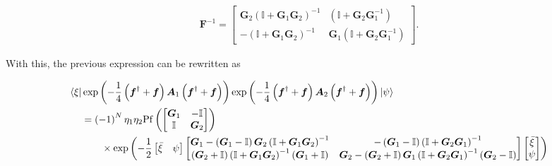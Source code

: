 \documentclass{article}
\begin{document}
	\begin{align}
		\boldsymbol{F}^{-1} =
		\begin{bmatrix}
			\boldsymbol{G}_{2}\left(\mathbb{I} + \boldsymbol{G}_{1}\boldsymbol{G}_{2} \right)^{-1} & \left(\mathbb{I} + \boldsymbol{G}_{2}\boldsymbol{G}_{1}^{-1} \right)\\
			-\left(\mathbb{I} + \boldsymbol{G}_{1}\boldsymbol{G}_{2} \right)^{-1} & \boldsymbol{G}_{1}\left(\mathbb{I} + \boldsymbol{G}_{2}\boldsymbol{G}_{1}^{-1} \right) 
		\end{bmatrix} .
	\end{align}
	
	With this, the previous expression can be rewritten as
	
	\begin{align}
		\bra{\xi} &\exp \left( -\frac{1}{4}\left( \boldsymbol{f}^\dagger + \boldsymbol{f} \right) \boldsymbol{A}_{1} \left( \boldsymbol{f}^\dagger + \boldsymbol{f} \right) \right) \exp \left( -\frac{1}{4}\left( \boldsymbol{f}^\dagger + \boldsymbol{f} \right) \boldsymbol{A}_{2} \left( \boldsymbol{f}^\dagger + \boldsymbol{f} \right) \right) \ket{\psi} \nonumber \\
		&=\left(-1\right)^{N}\eta_{1}\eta_2\mathrm{Pf} \left(\begin{bmatrix}
			\boldsymbol{G}_{1} & -\mathbb{I} \\
			\mathbb{I} & \boldsymbol{G}_{2} 
		\end{bmatrix} \right) \nonumber \\
		&\quad\quad\times \exp \left( -\frac{1}{2}\begin{bmatrix}
			\bar{\xi}& \psi
		\end{bmatrix}  
		\begin{bmatrix}
			\boldsymbol{G}_{1}  - \left( \boldsymbol{G}_{1} - \mathbb{I}\right)\boldsymbol{G}_{2}\left(\mathbb{I} + \boldsymbol{G}_{1}\boldsymbol{G}_{2}\right)^{-1} 
			& -\left(\boldsymbol{G}_{1} - \mathbb{I}\right)\left(\mathbb{I} + \boldsymbol{G}_{2} \boldsymbol{G}_{1}\right)^{-1} \\
			\left(\boldsymbol{G}_{2} + \mathbb{I}\right)\left(\mathbb{I} + \boldsymbol{G}_{1}\boldsymbol{G}_{2}\right)^{-1}\left(\boldsymbol{G}_{1} + \mathbb{I}\right) 
			& \boldsymbol{G}_{2} - \left(\boldsymbol{G}_{2} + \mathbb{I}\right)\boldsymbol{G}_{1}\left(\mathbb{I}+\boldsymbol{G}_{2}\boldsymbol{G}_{1}\right)^{-1}\left(\boldsymbol{G}_{2} - \mathbb{I}\right) 
		\end{bmatrix}
		\begin{bmatrix}
			\bar{\xi}\\ \psi
		\end{bmatrix}  \right) 
	\end{align}
	
\end{document}
